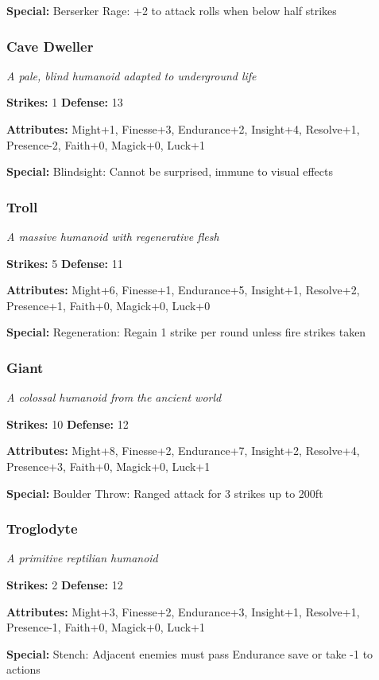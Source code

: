 \documentclass[10pt,twoside]{article}
\begin{document}
\textbf{Special:} Berserker Rage: +2 to attack rolls when below half strikes

\subsubsection{Cave Dweller}
\textit{A pale, blind humanoid adapted to underground life}

\textbf{Strikes:} 1 \quad \textbf{Defense:} 13

\textbf{Attributes:} Might+1, Finesse+3, Endurance+2, Insight+4, Resolve+1, Presence-2, Faith+0, Magick+0, Luck+1

\textbf{Special:} Blindsight: Cannot be surprised, immune to visual effects

\subsubsection{Troll}
\textit{A massive humanoid with regenerative flesh}

\textbf{Strikes:} 5 \quad \textbf{Defense:} 11

\textbf{Attributes:} Might+6, Finesse+1, Endurance+5, Insight+1, Resolve+2, Presence+1, Faith+0, Magick+0, Luck+0

\textbf{Special:} Regeneration: Regain 1 strike per round unless fire strikes taken

\subsubsection{Giant}
\textit{A colossal humanoid from the ancient world}

\textbf{Strikes:} 10 \quad \textbf{Defense:} 12

\textbf{Attributes:} Might+8, Finesse+2, Endurance+7, Insight+2, Resolve+4, Presence+3, Faith+0, Magick+0, Luck+1

\textbf{Special:} Boulder Throw: Ranged attack for 3 strikes up to 200ft

\subsubsection{Troglodyte}
\textit{A primitive reptilian humanoid}

\textbf{Strikes:} 2 \quad \textbf{Defense:} 12

\textbf{Attributes:} Might+3, Finesse+2, Endurance+3, Insight+1, Resolve+1, Presence-1, Faith+0, Magick+0, Luck+1

\textbf{Special:} Stench: Adjacent enemies must pass Endurance save or take -1 to actions
\end{document}
